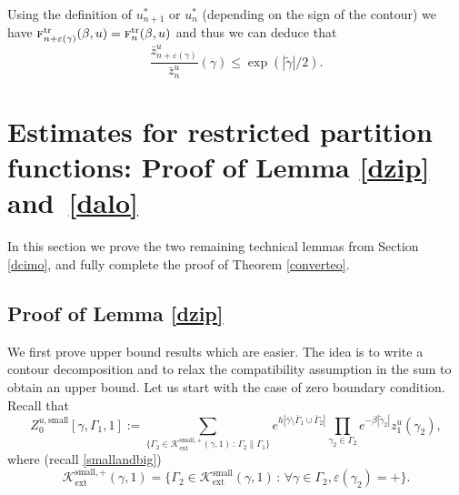 \documentclass[10pt]{amsart}
\let\mathcal\mathscr
\newcommand{\sep}{\,:\,}
\numberwithin{equation}{section}
\theoremstyle{plain}
\theoremstyle{definition}
\newcommand{\ext}{\mathrm{ext}}
\newcommand{\sm}{\mathrm{small}}
\newcommand{\cK}{{\ensuremath{\mathcal K}} }
\newcommand{\gb}{\beta}
\newcommand{\gep}{\varepsilon}
\newcommand{\gG}{\Gamma}
\newcommand{\tr}{\mathrm{tr}}
\newcommand{\tf}{\textsc{f}}
\begin{document}
Using the definition of $u^*_{n+1}$ or $u^*_n$ (depending on the sign of the contour)
we have $\tf^{\tr}_{n+\gep(\gamma)}(\gb,u)=\tf^{\tr}_{n}(\gb,u)$ and thus we can deduce that
\begin{equation*}
\frac{ \bar z^u_{n+\gep(\gamma)}}{\bar z^u_{n}}(\gamma)\le \exp\left(|\tilde \gamma|/2\right).
\end{equation*}

\section{Estimates for restricted partition functions: Proof of Lemma \ref{dzip} and~\ref{dalo}}\label{secrestrict}

In this section we prove the two remaining technical lemmas from Section \ref{dcimo}, and fully complete the proof of Theorem \ref{converteo}.

\subsection{Proof of Lemma \ref{dzip}}
We first prove upper bound results which are easier. The idea is to write a contour decomposition and to relax the compatibility assumption in the sum to obtain an upper bound.
Let us start with the case of zero boundary condition.
Recall that
\begin{equation*}%
Z^{u,\sm}_{0}[\gamma,\gG_1,1]:= \sum_{\{ \gG_2 \in \cK^{\sm,+}_{\ext}(\gamma,1) \sep \gG_2 \parallel \gG_1\}} e^{h|\bar \gamma \setminus \bar \gG_1\cup \bar \gG_2|} \prod_{\gamma_2\in \gG_2 }
e^{-\gb |\tilde\gamma_2|}
z^u_{1}(\gamma_2),
\end{equation*}
where (recall \eqref{smallandbig})
\[
\cK^{\sm,+}_{\ext}(\gamma,1)=\{ \gG_2\in \cK^{\sm}_{\ext}(\gamma,1) \sep \forall \gamma\in \gG_2, \gep(\gamma_2)=+\}.
\]
\end{document}
